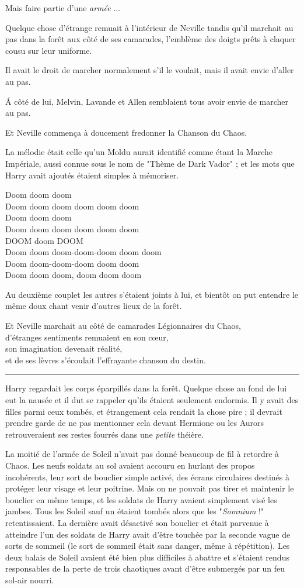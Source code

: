 Mais faire partie d'une \emph{armée} ...

Quelque chose d'étrange remuait à l'intérieur de Neville tandis qu'il marchait au pas dans la forêt aux côté de ses camarades, l'emblème des doigts prêts à claquer cousu sur leur uniforme.

Il avait le droit de marcher normalement s'il le voulait, mais il avait envie d'aller au pas.

Á côté de lui, Melvin, Lavande et Allen semblaient tous avoir envie de marcher au pas.

Et Neville commença à doucement fredonner la Chanson du Chaos.

La mélodie était celle qu'un Moldu aurait identifié comme étant la Marche Impériale, aussi connue sous le nom de "Thème de Dark Vador" ; et les mots que Harry avait ajoutés étaient simples à mémoriser.

Doom doom doom\\Doom doom doom doom doom doom\\Doom doom doom\\Doom doom doom doom doom doom\\DOOM doom DOOM\\Doom doom doom-doom-doom doom doom\\Doom doom-doom-doom doom doom\\Doom doom doom, doom doom doom

Au deuxième couplet les autres s'étaient joints à lui, et bientôt on put entendre le même doux chant venir d'autres lieux de la forêt.

Et Neville marchait au côté de camarades Légionnaires du Chaos,\\d'étranges sentiments remuaient en son cœur,\\son imagination devenait réalité,\\et de ses lèvres s'écoulait l'effrayante chanson du destin.
\par\noindent\rule{\textwidth}{0.4pt}
Harry regardait les corps éparpillés dans la forêt. Quelque chose au fond de lui eut la nausée et il dut se rappeler qu'ils étaient seulement endormis. Il y avait des filles parmi ceux tombés, et étrangement cela rendait la chose pire ; il devrait prendre garde de ne pas mentionner cela devant Hermione ou les Aurors retrouveraient ses restes fourrés dans une \emph{petite}  théière.

La moitié de l'armée de Soleil n'avait pas donné beaucoup de fil à retordre à Chaos. Les neufs soldats au sol avaient accouru en hurlant des propos incohérents, leur sort de bouclier simple activé, des écrans circulaires destinés à protéger leur visage et leur poitrine. Mais on ne pouvait pas tirer et maintenir le bouclier en même temps, et les soldats de Harry avaient simplement visé les jambes. Tous les Soleil sauf un étaient tombés alors que les "\emph{Somnium}  !" retentissaient. La dernière avait désactivé son bouclier et était parvenue à atteindre l'un des soldats de Harry avait d'être touchée par la seconde vague de sorts de sommeil (le sort de sommeil était sans danger, même à répétition). Les deux balais de Soleil avaient été bien plus difficiles à abattre et s'étaient rendus responsables de la perte de trois chaotiques avant d'être submergés par un feu sol-air nourri.

